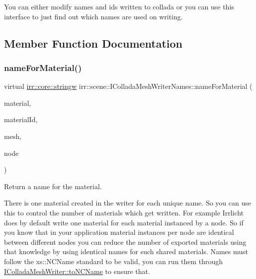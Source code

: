 You can either modify names and id\textquotesingle{}s written to collada or you can use this interface to just find out which names are used on writing. 

\subsection{Member Function Documentation}
\mbox{\label{classirr_1_1scene_1_1IColladaMeshWriterNames_acb5c8f38769d3fedcc76df73d9350c07}} 
\subsubsection{\texorpdfstring{name\+For\+Material()}{nameForMaterial()}}
{\footnotesize\ttfamily virtual \hyperlink{namespaceirr_1_1core_aef83fafbb1b36fcce44c07c9be23a7f2}{irr\+::core\+::stringw} irr\+::scene\+::\+I\+Collada\+Mesh\+Writer\+Names\+::name\+For\+Material (\begin{DoxyParamCaption}\item[{const \hyperlink{classirr_1_1video_1_1SMaterial}{video\+::\+S\+Material} \&}]{material,  }\item[{int}]{material\+Id,  }\item[{const \hyperlink{classirr_1_1scene_1_1IMesh}{scene\+::\+I\+Mesh} $\ast$}]{mesh,  }\item[{const \hyperlink{classirr_1_1scene_1_1ISceneNode}{scene\+::\+I\+Scene\+Node} $\ast$}]{node }\end{DoxyParamCaption})\hspace{0.3cm}{\ttfamily [pure virtual]}}



Return a name for the material. 

There is one material created in the writer for each unique name. So you can use this to control the number of materials which get written. For example Irrlicht does by default write one material for each material instanced by a node. So if you know that in your application material instances per node are identical between different nodes you can reduce the number of exported materials using that knowledge by using identical names for such shared materials. Names must follow the xs\+::\+N\+C\+Name standard to be valid, you can run them through \hyperlink{classirr_1_1scene_1_1IColladaMeshWriter_ac9c48beab095aa6f4cb4f696bb2ecd45}{I\+Collada\+Mesh\+Writer\+::to\+N\+C\+Name} to ensure that. \mbox{\label{classirr_1_1scene_1_1IColladaMeshWriterNames_a2d36f1dee5904b3c622363282761ed0d}} 
